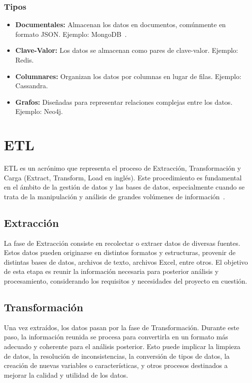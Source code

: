 \subsubsection{Tipos}
\begin{itemize}
\item \textbf{Documentales:} Almacenan los datos en documentos, comúnmente en formato JSON. Ejemplo: MongoDB~\cite{mongodb}.
\item \textbf{Clave-Valor:} Los datos se almacenan como pares de clave-valor. Ejemplo: Redis.
\item \textbf{Columnares:} Organizan los datos por columnas en lugar de filas. Ejemplo: Cassandra.
\item \textbf{Grafos:} Diseñadas para representar relaciones complejas entre los datos. Ejemplo: Neo4j.
\end{itemize}

\clearpage
\section{ETL}

ETL es un acrónimo que representa el proceso de Extracción, Transformación y Carga (Extract, Transform, Load en inglés). Este procedimiento es fundamental en el ámbito de la gestión de datos y las bases de datos, especialmente cuando se trata de la manipulación y análisis de grandes volúmenes de información~\cite{aqlan2018}.

\subsection{Extracción}

La fase de Extracción consiste en recolectar o extraer datos de diversas fuentes. Estos datos pueden originarse en distintos formatos y estructuras, provenir de distintas bases de datos, archivos de texto, archivos Excel, entre otros. El objetivo de esta etapa es reunir la información necesaria para posterior análisis y procesamiento, considerando los requisitos y necesidades del proyecto en cuestión.

\subsection{Transformación}

Una vez extraídos, los datos pasan por la fase de Transformación. Durante este paso, la información reunida se procesa para convertirla en un formato más adecuado y coherente para el análisis posterior. Esto puede implicar la limpieza de datos, la resolución de inconsistencias, la conversión de tipos de datos, la creación de nuevas variables o características, y otros procesos destinados a mejorar la calidad y utilidad de los datos.

